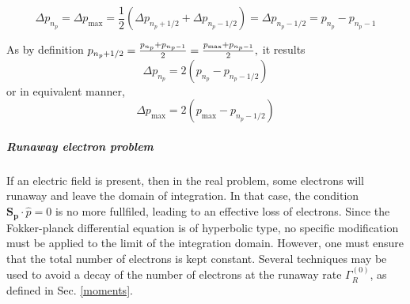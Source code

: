 \begin{equation}
\Delta p_{n_{p}}=\Delta p_{\max }=\frac{1}{2}\left( \Delta
p_{n_{p}+1/2}+\Delta p_{n_{p}-1/2}\right) =\Delta
p_{n_{p}-1/2}=p_{n_{p}}-p_{n_{p}-1}
\end{equation}

As by definition $p_{n_{p}+1/2}=\frac{p_{n_{p}}+p_{n_{p}-1}}{2}=\frac{%
p_{\max }+p_{n_{p}-1}}{2},$ it results
\begin{equation}
\Delta p_{n_{p}}=2\left( p_{n_{p}}-p_{n_{p}-1/2}\right)
\end{equation}
or in equivalent manner,
\begin{equation}
\Delta p_{\max }=2\left( p_{\max }-p_{n_{p}-1/2}\right)
\end{equation}

\subparagraph{Runaway electron problem}

If an electric field is present, then in the real problem, some electrons
will runaway and leave the domain of integration. In that case, the
condition $\mathbf{S}_{\mathbf{p}}\cdot \widehat{p}=0$ is no more fullfiled,
leading to an effective loss of electrons. Since the Fokker-planck
differential equation is of hyperbolic type, no specific modification must
be applied to the limit of the integration domain. However, one must ensure
that the total number of electrons is kept constant. Several techniques may
be used to avoid a decay of the number of electrons at the runaway rate $%
\Gamma _{R}^{\left( 0\right) }$, as defined in Sec. \ref{moments}.


